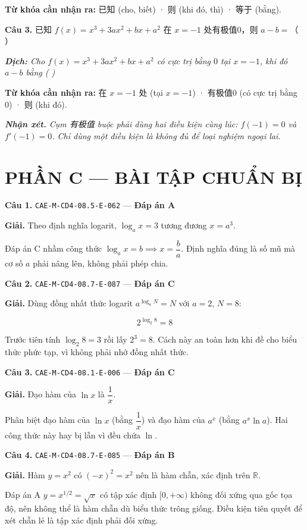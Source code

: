 \documentclass[11pt, a4paper]{article}
\begin{document}
\textbf{Từ khóa cần nhận ra:} 已知 (cho, biết) · 则 (khi đó, thì) · 等于 (bằng).

\textbf{Câu 3.} 已知 $f(x) = x^3 + 3ax^2 + bx + a^2$ 在 $x = -1$ 处有极值0，则 $a - b =$（ ）

\noindent\emph{\textbf{Dịch:} Cho $f(x) = x^3 + 3ax^2 + bx + a^2$ có cực trị bằng $0$ tại $x = -1$, khi đó $a - b$ bằng ( )}

\textbf{Từ khóa cần nhận ra:} 在 $x = -1$ 处 (tại $x = -1$) · 有极值0 (có cực trị bằng 0) · 则 (khi đó).

\noindent\emph{\textbf{Nhận xét.} Cụm 有极值 buộc phải dùng hai điều kiện cùng lúc: $f(-1) = 0$ và $f'(-1) = 0$. Chỉ dùng một điều kiện là không đủ để loại nghiệm ngoại lai.}

\section{PHẦN C — BÀI TẬP CHUẨN BỊ}

\textbf{Câu 1.} \texttt{CAE-M-CD4-08.5-E-062} — \textbf{Đáp án A}

\textbf{Giải.} Theo định nghĩa logarit, $\log_a x = 3$ tương đương $x = a^3$.

 Đáp án C nhầm công thức $\log_a x = b \implies x = \dfrac{b}{a}$. Định nghĩa đúng là số mũ mà cơ số $a$ phải nâng lên, không phải phép chia.

\textbf{Câu 2.} \texttt{CAE-M-CD4-08.7-E-087} — \textbf{Đáp án C}

\textbf{Giải.} Dùng đồng nhất thức logarit $a^{\log_a N} = N$ với $a = 2$, $N = 8$:

$$2^{\log_2 8} = 8$$

 Trước tiên tính $\log_2 8 = 3$ rồi lấy $2^3 = 8$. Cách này an toàn hơn khi đề cho biểu thức phức tạp, vì không phải nhớ đồng nhất thức.

\textbf{Câu 3.} \texttt{CAE-M-CD4-08.1-E-006} — \textbf{Đáp án C}

\textbf{Giải.} Đạo hàm của $\ln x$ là $\dfrac{1}{x}$.

 Phân biệt đạo hàm của $\ln x$ (bằng $\dfrac{1}{x}$) và đạo hàm của $a^x$ (bằng $a^x \ln a$). Hai công thức này hay bị lẫn vì đều chứa $\ln$.

\textbf{Câu 4.} \texttt{CAE-M-CD4-08.7-E-085} — \textbf{Đáp án B}

\textbf{Giải.} Hàm $y = x^2$ có $(-x)^2 = x^2$ nên là hàm chẵn, xác định trên $\mathbb{R}$.

 Đáp án A $y = x^{1/2} = \sqrt{x}$ có tập xác định $[0, +\infty)$ không đối xứng qua gốc tọa độ, nên không thể là hàm chẵn dù biểu thức trông giống. Điều kiện tiên quyết để xét chẵn lẻ là tập xác định phải đối xứng.
\end{document}
